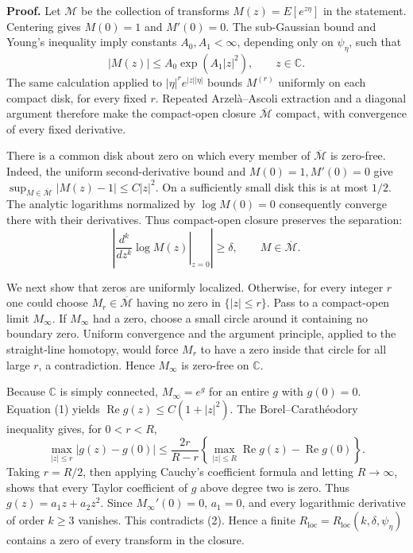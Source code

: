 \textbf{Proof.}
Let \(\mathscr M\) be the collection of transforms \(M(z)=E[e^{z\eta}]\) in the statement.  Centering gives \(M(0)=1\) and \(M'(0)=0\).  The sub-Gaussian bound and Young's inequality imply constants \(A_0,A_1<\infty\), depending only on \(\psi_\eta\), such that
\[
 |M(z)|\le A_0\exp(A_1|z|^2),\qquad z\in\mathbb C. \tag{1}
\]
The same calculation applied to \(|\eta|^r e^{|z||\eta|}\) bounds \(M^{(r)}\) uniformly on each compact disk, for every fixed \(r\).  Repeated Arzel\`a--Ascoli extraction and a diagonal argument therefore make the compact-open closure \(\overline{\mathscr M}\) compact, with convergence of every fixed derivative.

There is a common disk about zero on which every member of \(\overline{\mathscr M}\) is zero-free.  Indeed, the uniform second-derivative bound and \(M(0)=1,M'(0)=0\) give \(\sup_{M\in\overline{\mathscr M}}|M(z)-1|\le C|z|^2\).  On a sufficiently small disk this is at most \(1/2\).  The analytic logarithms normalized by \(\log M(0)=0\) consequently converge there with their derivatives.  Thus compact-open closure preserves the separation:
\[
 \left|\left.\frac{d^k}{dz^k}\log M(z)\right|_{z=0}\right|\ge\delta,
 \qquad M\in\overline{\mathscr M}. \tag{2}
\]

We next show that zeros are uniformly localized.  Otherwise, for every integer \(r\) one could choose \(M_r\in\overline{\mathscr M}\) having no zero in \(\{|z|\le r\}\).  Pass to a compact-open limit \(M_\infty\).  If \(M_\infty\) had a zero, choose a small circle around it containing no boundary zero.  Uniform convergence and the argument principle, applied to the straight-line homotopy, would force \(M_r\) to have a zero inside that circle for all large \(r\), a contradiction.  Hence \(M_\infty\) is zero-free on \(\mathbb C\).

Because \(\mathbb C\) is simply connected, \(M_\infty=e^g\) for an entire \(g\) with \(g(0)=0\).  Equation (1) yields \(\operatorname{Re}g(z)\le C(1+|z|^2)\).  The Borel--Carath\'eodory inequality gives, for \(0<r<R\),
\[
 \max_{|z|\le r}|g(z)-g(0)|
 \le \frac{2r}{R-r}
 \left\{\max_{|z|\le R}\operatorname{Re}g(z)-\operatorname{Re}g(0)\right\}. \tag{3}
\]
Taking \(r=R/2\), then applying Cauchy's coefficient formula and letting \(R\to\infty\), shows that every Taylor coefficient of \(g\) above degree two is zero.  Thus \(g(z)=a_1z+a_2z^2\).  Since \(M_\infty'(0)=0\), \(a_1=0\), and every logarithmic derivative of order \(k\ge3\) vanishes.  This contradicts (2).  Hence a finite \(R_{\mathrm{loc}}=R_{\mathrm{loc}}(k,\delta,\psi_\eta)\) contains a zero of every transform in the closure.


